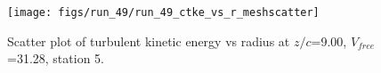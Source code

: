 \begin{figure}[H]
\centering
\texttt{[image: figs/run\_49/run\_49\_ctke\_vs\_r\_meshscatter]}
\caption{Scatter plot of turbulent kinetic energy vs radius at $z/c$=9.00, $V_{free}$=31.28, station 5.}
\label{fig:run_49_ctke_vs_r_meshscatter}
\end{figure}


